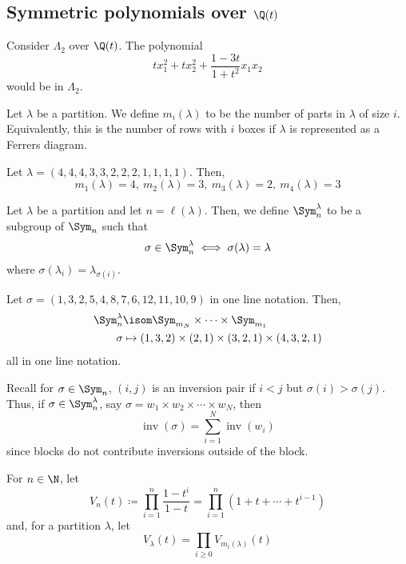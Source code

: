 \documentclass[11pt,leqno,oneside]{amsart}
\numberwithin{thm}{section}
\newcommand{\inv}{\operatorname{inv}}
\newcommand{\defeq}{\coloneqq}
\newcommand{\sym}{\Lambda}
\begin{document}
\subsection{Symmetric polynomials over \(\Q(t)\)}
\begin{example}
  Consider \(\sym_2\) over \(\Q(t)\). The polynomial \[
    t x_1^2 + t x_2^2 + \frac{1-3t}{1+t^2} x_1 x_2
  \]
  would be in \(\sym_2\).
\end{example}
\begin{defn}
  Let \(\lambda\) be a partition. We define \(m_i(\lambda)\) to be the
  number of parts in \(\lambda\) of size \(i\). Equivalently, this is
  the number of rows with \(i\) boxes if \(\lambda\) is represented as
  a Ferrers diagram.
\end{defn}
\begin{example}
  Let \(\lambda = (4,4,4,3,3,2,2,2,1,1,1,1)\). Then, \[
    m_1(\lambda) = 4, \ m_2(\lambda) = 3, \ m_3(\lambda) = 2, \
    m_4(\lambda) = 3
  \]
\end{example}
\begin{defn}
  Let \(\lambda\) be a partition and let \(n = \ell(\lambda)\). Then,
  we define \(\Sym_n^\lambda\) to be a subgroup of \(\Sym_n\) such
  that \[
    \sigma \in \Sym_n^\lambda \iff \sigma(\lambda) = \lambda
  \]
  where \(\sigma(\lambda_i) = \lambda_{\sigma(i)}\).
\end{defn}
\begin{example}
  Let \(\sigma = (1,3,2,5,4,8,7,6,12,11,10,9)\) in one line
  notation. Then,
  \begin{align*}
    \Sym_n^\lambda & \isom \Sym_{m_N} \times \cdots \times \Sym_{m_1} \\
    \sigma & \mapsto (1,3,2) \times (2,1) \times (3,2,1) \times (4,3,2,1)
  \end{align*}
  all in one line notation.
\end{example}
\begin{rmk}\label{inv-plays-nice-with-prod}
  Recall for \(\sigma \in \Sym_n\), \((i,j)\) is an inversion pair if
  \(i < j\) but \(\sigma(i) > \sigma(j)\). Thus, if \(\sigma \in
  \Sym_n^\lambda\), say \(\sigma = w_1 \times w_2 \times \cdots \times
  w_N\), then \[
    \inv(\sigma) = \sum_{i=1}^N \inv(w_i)
  \]
  since blocks do not contribute inversions outside of the block.
\end{rmk}
\begin{defn}
  For \(n \in \N\), let \[
    V_n(t) \defeq \prod_{i=1}^n \frac{1-t^i}{1-t} = \prod_{i=1}^n (1+t+\cdots+t^{i-1})
  \]
  and, for a partition \(\lambda\), let \[
    V_\lambda(t) = \prod_{i \geq 0} V_{m_i(\lambda)}(t)
  \]
\end{defn}
\end{document}
